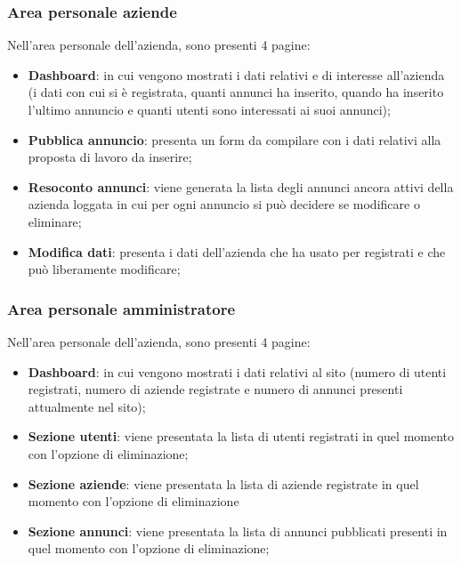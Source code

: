 		\subsubsection{Area personale aziende}
		Nell'area personale dell'azienda, sono presenti 4 pagine:
		\begin{itemize}
			\item \textbf{Dashboard}: in cui vengono mostrati i dati relativi e di interesse all'azienda (i dati con cui si è registrata, quanti annunci ha inserito, quando ha inserito l'ultimo annuncio e quanti utenti sono interessati ai suoi annunci);
			\item \textbf{Pubblica annuncio}: presenta un form da compilare con i dati relativi alla proposta di lavoro da inserire;
			\item \textbf{Resoconto annunci}: viene generata la lista degli annunci ancora attivi della azienda loggata in cui per ogni annuncio si può decidere se modificare o eliminare;
			\item \textbf{Modifica dati}: presenta i dati dell'azienda che ha usato per registrati e che può liberamente modificare;
		\end{itemize}
		\subsubsection{Area personale amministratore}
		Nell'area personale dell'azienda, sono presenti 4 pagine:
		\begin{itemize}
			\item \textbf{Dashboard}: in cui vengono mostrati i dati relativi al sito (numero di utenti registrati, numero di aziende registrate e numero di annunci presenti attualmente nel sito);
			\item \textbf{Sezione utenti}: viene presentata la lista di utenti registrati in quel momento con l'opzione di eliminazione;
			\item \textbf{Sezione aziende}: viene presentata la lista di aziende registrate in quel momento con l'opzione di eliminazione
			\item \textbf{Sezione annunci}: viene presentata la lista di annunci pubblicati presenti in quel momento con l'opzione di eliminazione;
		\end{itemize}
	
